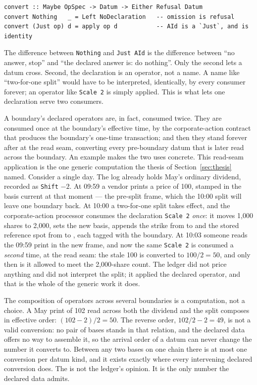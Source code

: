 \begin{lstlisting}
convert :: Maybe OpSpec -> Datum -> Either Refusal Datum
convert Nothing   _ = Left NoDeclaration   -- omission is refusal
convert (Just op) d = apply op d           -- AId is a `Just`, and is identity
\end{lstlisting}

The difference between \texttt{Nothing} and \texttt{Just AId} is the difference
between ``no answer, stop'' and ``the declared answer is: do nothing''. Only the
second lets a datum cross. Second, the declaration is an operator, not a name. A
name like ``two-for-one split'' would have to be interpreted, identically, by
every consumer forever; an operator like \texttt{Scale 2} is simply applied. This
is what lets one declaration serve two consumers.

A boundary's declared operators are, in fact, consumed twice. They are consumed
once at the boundary's effective time, by the corporate-action contract that
produces the boundary's one-time transaction; and then they stand forever after
at the read seam, converting every pre-boundary datum that is later read across
the boundary. An example makes the two uses concrete. This read-seam application is
the one generic computation the thesis of Section~\ref{sec:thesis} named. Consider a
single day. The log already holds May's  ordinary dividend, recorded as
\texttt{Shift} $-2$. At 09:59 a vendor prints a price of 100, stamped in the basis
current at that moment --- the pre-split frame, which the 10:00 split will leave one
boundary back. At 10:00 a two-for-one split takes effect, and the
corporate-action processor consumes the declaration \texttt{Scale 2} \emph{once}:
it moves 1{,}000 shares to 2{,}000, sets the new basis, appends the strike from
 to  and the stored reference spot from  to ,
each tagged with the boundary. At 10:03 someone reads the 09:59 print in the new
frame, and now the same \texttt{Scale 2} is consumed a \emph{second} time, at the
read seam: the stale 100 is converted to $100/2 = 50$, and only then is it allowed
to meet the 2{,}000-share count. The ledger did not price anything and did not
interpret the split; it applied the declared operator, and that is the whole of
the generic work it does.

The composition of operators across several boundaries is a computation, not a
choice. A May print of 102 read across both the dividend and the split composes in
effective order: $(102 - 2)/2 = 50$. The reverse order, $102/2 - 2 = 49$, is not a
valid conversion: no pair of bases stands in that relation, and the declared data
offers no way to assemble it, so the arrival order of a datum can never change the
number it converts to.
Between any two bases on one chain there is at most one conversion per datum kind,
and it exists exactly where every intervening declared conversion does. The
 is not the ledger's opinion. It is the only number the declared data
admits.
